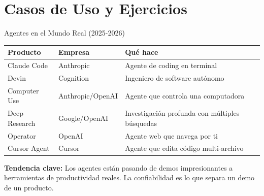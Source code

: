 \documentclass[aspectratio=169]{beamer}
\begin{document}
\section{Casos de Uso y Ejercicios}
\begin{frame}{Agentes en el Mundo Real (2025-2026)}
    \begin{table}[]
        \centering
        \renewcommand{\arraystretch}{1.3}
        \scriptsize
        \begin{tabular}{p{2.5cm} p{3.5cm} p{5.5cm}}
            \toprule
            \textbf{Producto} & \textbf{Empresa} & \textbf{Qué hace} \\
            \midrule
            Claude Code & Anthropic & Agente de coding en terminal \\
            Devin & Cognition & Ingeniero de software autónomo \\
            Computer Use & Anthropic/OpenAI & Agente que controla una computadora \\
            Deep Research & Google/OpenAI & Investigación profunda con múltiples búsquedas \\
            Operator & OpenAI & Agente web que navega por ti \\
            Cursor Agent & Cursor & Agente que edita código multi-archivo \\
            \bottomrule
        \end{tabular}
    \end{table}
    
    \vspace{0.2cm}
    \textbf{Tendencia clave:} Los agentes están pasando de demos impresionantes a herramientas de productividad reales. La confiabilidad es lo que separa un demo de un producto.
\end{frame}
\end{document}
